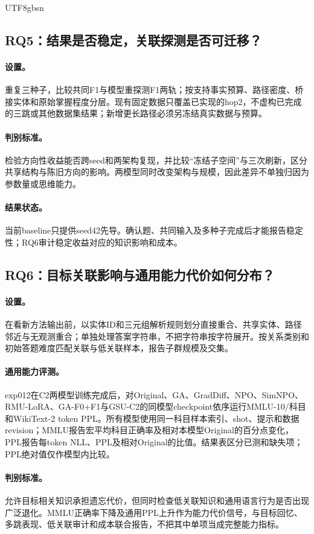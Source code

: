 \documentclass[sigconf,anonymous,review]{acmart}
\begin{document}
\begin{CJK*}{UTF8}{gbsn}
\subsection{RQ5：结果是否稳定，关联探测是否可迁移？}
\paragraph{设置。}重复三种子，比较共同F1与模型重探测F1两轨；按支持事实预算、路径密度、桥接实体和原始掌握程度分层。现有固定数据只覆盖已实现的hop2，不虚构已完成的三跳或其他数据集结果；新增更长路径必须另冻结真实数据与预算。
\paragraph{判别标准。}检验方向性收益能否跨seed和两架构复现，并比较“冻结子空间”与三次刷新，区分共享结构与陈旧方向的影响。两模型同时改变架构与规模，因此差异不单独归因为参数量或思维能力。
\paragraph{结果状态。}当前baseline只提供seed42先导。确认题、共同输入及多种子完成后才能报告稳定性；RQ6审计稳定收益对应的知识影响和成本。

\subsection{RQ6：目标关联影响与通用能力代价如何分布？}
\paragraph{设置。}在看新方法输出前，以实体ID和三元组解析规则划分直接重合、共享实体、路径邻近与无观测重合；单独处理答案字符串，不把字符串按字符展开。按关系类别和初始答题难度匹配关联与低关联样本，报告子群规模及交集。
\paragraph{通用能力评测。}exp012在C2两模型训练完成后，对Original、GA、GradDiff、NPO、SimNPO、RMU-LoRA、GA-F0+F1与GSU-C2的同模型checkpoint依序运行MMLU-10/科目和WikiText-2 token PPL。所有模型使用同一科目样本索引、shot、提示和数据revision；MMLU报告宏平均科目正确率及相对本模型Original的百分点变化，PPL报告每token NLL、PPL及相对Original的比值。结果表区分已测和缺失项；PPL绝对值仅作模型内比较。
\paragraph{判别标准。}允许目标相关知识承担遗忘代价，但同时检查低关联知识和通用语言行为是否出现广泛退化。MMLU正确率下降及通用PPL上升作为能力代价信号，与目标回忆、多跳表现、低关联审计和成本联合报告，不把其中单项当成完整能力指标。

\end{CJK*}
\end{document}
